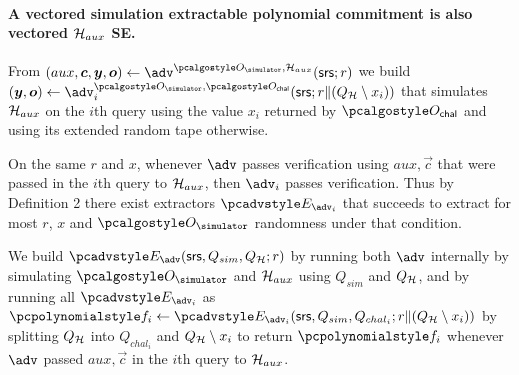 \documentclass[runningheads,11pt]{llncs}
\begin{document}
\paragraph{A vectored simulation extractable polynomial commitment is also vectored $\mathcal{H}_{aux}$ SE.}
From $(aux, \vec{c}, \vec{y}, \vec{o}) \gets \adv^{\oracles,\ro_{aux}}(\srs; r)$ we build $(\vec{y},\vec{o}) \gets \adv_{i}^{\oracles,\oraclec}(\srs; r\|(Q_{\ro}\setminus x_{i}))$ that simulates $\mathcal{H}_{aux}$ on the $i$th query using the value $x_{i}$ returned by $\oraclec$ and using its extended random tape otherwise.

On the same $r$ and $x$, whenever $\adv$ passes verification using $aux,\vec{c}$ that were passed in the $i$th query to $\mathcal{H}_{aux}$, then $\adv_{i}$ passes verification.  Thus by Definition 2 there exist extractors $\Ext_{\adv_{i}}$ that succeeds to extract for most $r$, $x$ and $\oracles$ randomness under that condition.

We build $\Ext_{\adv}(\srs, Q_{sim}, Q_{\ro}; r)$ by running both $\adv$ internally by simulating $\oracles$ and $\mathcal{H}_{aux}$ using $Q_{sim}$ and $Q_{\mathcal{H}}$, and by running all $\Ext_{\adv_{i}}$ as $\p{f}_{i}\gets \Ext_{\adv_{i}}(\srs,Q_{sim},Q_{chal_{i}}; r\|(Q_{\ro}\setminus x_{i}))$ by splitting $Q_{\mathcal{H}}$ into $Q_{chal_{i}}$ and $Q_{\mathcal{H}}\setminus x_{i}$ to return $\p{f}_{i}$ whenever $\adv$ passed $aux,\vec{c}$ in the $i$th query to $\mathcal{H}_{aux}$.
\end{document}
